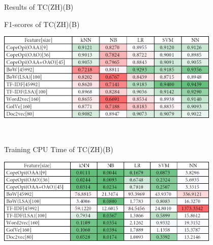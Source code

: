 \caption{Results of TC(ZH)(B)}
\label{tab:tc_zh_b}
\centering
\begin{subtable}{\textwidth}
	\centering
	\caption{F1-scores of TC(ZH)(B)}
	\includegraphics[width=0.8\textwidth]{./figure/02B2.png}
\end{subtable}\\[1em]
\begin{subtable}{\textwidth}
	\centering
	\caption{Training CPU Time of TC(ZH)(B)}
	\includegraphics[width=0.8\textwidth]{./figure/02B2t.png}
\end{subtable}
